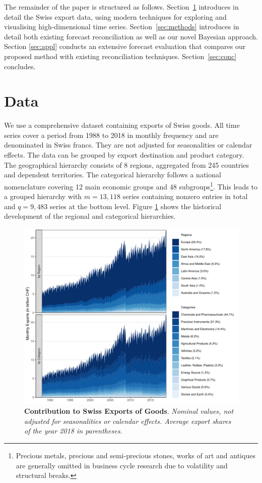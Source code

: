 \documentclass[a4paper,fleqn,11pt]{article}
\begin{document}
The remainder of the paper is structured as follows. Section~\ref{sec:data} introduces in detail the Swiss export data, using modern techniques for exploring and visualising high-dimensional time series.  Section~\ref{sec:methods} introduces in detail both existing forecast reconciliation as well as our novel Bayesian approach.  Section \ref{sec:appl} conducts an extensive forecast evaluation that compares our proposed method with existing reconciliation techniques. Section~\ref{sec:conc} concludes.

\clearpage



\section{Data}\label{sec:data}
We use a comprehensive dataset containing exports of Swiss goods. All time series cover a period from 1988 to 2018 in monthly frequency and are denominated in Swiss francs. They are not adjusted for seasonalities or calendar effects. The data can be grouped by export destination and product category. The geographical hierarchy consists of 8 regions, aggregated from 245 countries and dependent territories. The categorical hierarchy follows a national nomenclature covering 12 main economic groups and 48 subgroups\footnote{Precious metals, precious and semi-precious stones, works of art and antiques are generally omitted in business cycle research due to volatility and structural breaks.}. This leads to a grouped hierarchy with $m = 13,118$ series containing nonzero entries in total and $q = 9,483$ series at the bottom level. Figure \ref{fig:area} shows the historical development of the regional and categorical hierarchies.
\begin{figure}[H]
	\includegraphics[width=\textwidth]{fig/fig_area}
	\caption[Contribution to Swiss Exports of Goods]{\small{\textbf{Contribution to Swiss Exports of Goods}. \textit{Nominal values, not adjusted for seasonalities or calendar effects. Average export shares of the year 2018 in parentheses.}}}\label{fig:area}
\end{figure}
\end{document}
